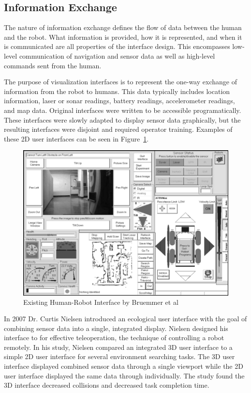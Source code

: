 \subsection{Information Exchange}
\label{sub:info_exchange}
The nature of information exchange defines the flow of data between the human and the robot. What information is provided, how it is represented, and when it is communicated are all properties of the interface design. This encompasses low-level communication of navigation and sensor data as well as high-level commands sent from the human. 

The purpose of visualization interfaces is to represent the one-way exchange of information from the robot to humans. This data typically includes location information, laser or sonar readings, battery readings, accelerometer readings, and map data. Original interfaces were written to be accessible programatically. These interfaces were slowly adapted to display sensor data graphically, but the resulting interfaces were disjoint and required operator training. Examples of these 2D user interfaces can be seen in Figure~\ref{fig:prior-hri}. \cite{Bruemmer}

\begin{figure}[ht]
\begin{center}
\includegraphics[width=5in]{images/prior-hri.png}
\caption{Existing Human-Robot Interface by Bruemmer et al
\label{fig:prior-hri}}
\end{center}
\end{figure}


In 2007 Dr. Curtis Nielsen introduced an ecological user interface with the goal of combining sensor data into a single, integrated display. Nielsen designed his interface to for effective teleoperation, the technique of controlling a robot remotely. In his study, Nielsen compared an integrated 3D user interface to a simple 2D user interface for several environment searching tasks. The 3D user interface displayed combined sensor data through a single viewport while the 2D user interface displayed the same data through individually. The study found the 3D interface decreased collisions and decreased task completion time. \cite{Nielsen_Teleoperation}

